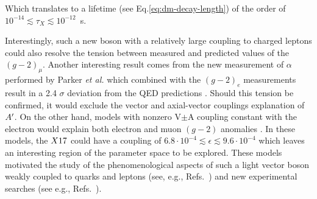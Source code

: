 Which translates to a lifetime (see Eq.\ref{eq:dm-decay-length}) of the order of $10^{-14}\lesssim \tau_X \lesssim 10^{-12}$~s.

Interestingly, such a new boson with a relatively large coupling to charged leptons could also resolve the tension between measured and predicted values of the $(g - 2)_{\mu}$. Another interesting result comes from the new measurement of $\alpha$ performed by Parker \textit{et al.} \cite{Parker191} which combined with the $(g-2)_e$ measurements result in a 2.4 $\sigma$ deviation from the QED predictions \cite{PhysRevLett.100.120801}. Should this tension be confirmed, it would exclude the vector and axial-vector couplings explanation of $A'$. On the other hand, models with nonzero V$\pm$A coupling constant with the electron would explain both electron and muon $(g - 2)$ anomalies \cite{Krasnikov:2019dgh}. In these models, the $X17$ could have a coupling of $6.8\cdot 10^{-4} \lesssim \epsilon \lesssim 9.6 \cdot 10^{-4}$ which leaves an interesting region of the parameter space to be explored. These models motivated the study of the phenomenological aspects of such a light vector boson weakly coupled to quarks and leptons (see, e.g., Refs.~\cite{fayet1, fayet2, fayet3, fayet4,jk, cheng, Zhang:2017zap, ia, liang, bart}) and new experimental searches (see e.g., Refs.~\cite{battaglieri2017cosmic, nardi}).


